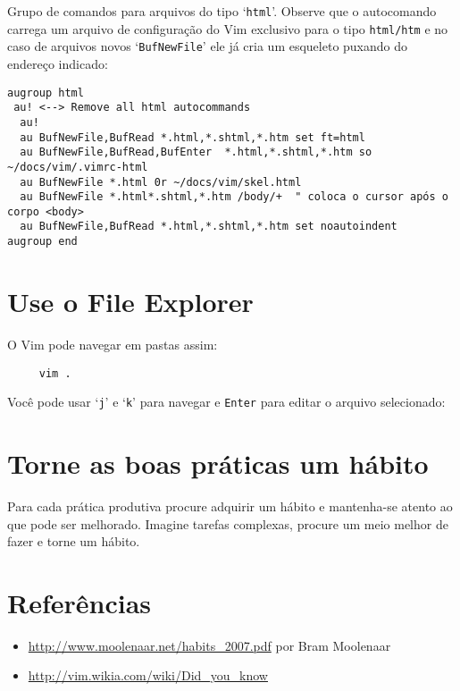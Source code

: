 Grupo de comandos para arquivos do tipo `{\tt html}'. Observe que o autocomando
carrega um arquivo de configuração do Vim exclusivo para o tipo {\tt html/htm}
e no caso de arquivos novos `{\tt BufNewFile}' ele já cria um esqueleto puxando
do endereço indicado:

\begin{verbatim}
augroup html
 au! <--> Remove all html autocommands
  au!
  au BufNewFile,BufRead *.html,*.shtml,*.htm set ft=html
  au BufNewFile,BufRead,BufEnter  *.html,*.shtml,*.htm so ~/docs/vim/.vimrc-html
  au BufNewFile *.html 0r ~/docs/vim/skel.html
  au BufNewFile *.html*.shtml,*.htm /body/+  " coloca o cursor após o corpo <body>
  au BufNewFile,BufRead *.html,*.shtml,*.htm set noautoindent
augroup end
\end{verbatim}


\section{Use o File Explorer}\label{Use o file explorer}

O Vim pode navegar em pastas assim:

\begin{verbatim}
     vim .
\end{verbatim}

Você pode usar `{\tt j}' e `{\tt k}' para navegar e {\tt Enter} para editar o arquivo
selecionado:

\section{Torne as boas práticas um hábito }
\label{Torne as boas práticas um hábito }

Para cada prática produtiva procure adquirir um hábito e mantenha-se
atento ao que pode ser melhorado. Imagine tarefas complexas, procure
um meio melhor de fazer e torne um hábito.

\section{Referências}
\label{Referências}
\begin{itemize}
   \item \url{http://www.moolenaar.net/habits\_2007.pdf} por Bram Moolenaar
   \item \url{http://vim.wikia.com/wiki/Did\_you\_know}
\end{itemize}
